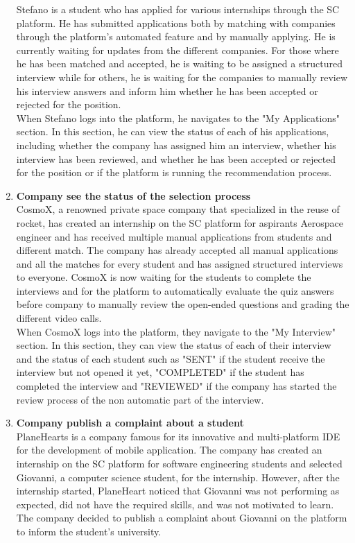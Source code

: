 \begin{enumerate}
        Stefano is a student who has applied for various internships through the SC platform. He has submitted applications both by matching with companies through the platform's automated feature and by manually applying. He is currently waiting for updates from the different companies. For those where he has been matched and accepted, he is waiting to be assigned a structured interview while for others, he is waiting for the companies to manually review his interview answers and inform him whether he has been accepted or rejected for the position.\\
        When Stefano logs into the platform, he navigates to the "My Applications" section. In this section, he can view the status of each of his applications, including whether the company has assigned him an interview, whether his interview has been reviewed, and whether he has been accepted or rejected for the position or if the platform is running the recommendation process.
    \item \textbf{Company see the status of the selection process}\\
        CosmoX, a renowned private space company that specialized in the reuse of rocket, has created an internship on the SC platform for aspirants Aerospace engineer and has received multiple manual applications from students and different match. The company has already accepted all manual applications and all the matches for every student and has assigned structured interviews to everyone.
        CosmoX is now waiting for the students to complete the interviews and for the platform to automatically evaluate the quiz answers  before company to manually review the open-ended questions and grading the different video calls.\\
        When CosmoX logs into the platform, they navigate to the "My Interview" section. In this section, they can view the status of each of their interview and the status of each student such as "SENT" if the student receive the interview but not opened it yet, "COMPLETED" if the student has completed the interview and "REVIEWED" if the company has started the review process of the non automatic part of the interview.
    \item \textbf{Company publish a complaint about a student}\\
        PlaneHearts is a company famous for its innovative and multi-platform IDE for the development of mobile application. The company has created an internship on the SC platform for software engineering students and selected Giovanni, a computer science student, for the internship. However, after the internship started, PlaneHeart noticed that Giovanni was not performing as expected, did not have the required skills, and was not motivated to learn. The company decided to publish a complaint about Giovanni on the platform to inform the student's university.\\

\end{enumerate}
